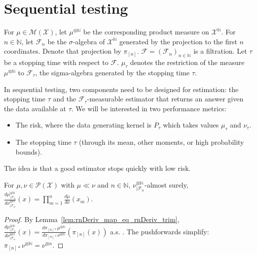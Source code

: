 \section{Sequential testing}

For $\mu \in \mathcal M(\mathcal X)$, let $\mu^{\otimes \mathbb{N}}$ be the corresponding product measure on $\mathcal X^{\mathbb{N}}$.
For $n \in \mathbb{N}$, let $\mathcal F_n$ be the $\sigma$-algebra of $\mathcal X^{\mathbb{N}}$ generated by the projection to the first $n$ coordinates. Denote that projection by $\pi_{[n]}$.
$\mathcal F = (\mathcal F_n)_{n \in \mathbb{N}}$ is a filtration.
Let $\tau$ be a stopping time with respect to $\mathcal F$. $\mu_\tau$ denotes the restriction of the measure $\mu^{\otimes \mathbb{N}}$ to $\mathcal F_\tau$, the sigma-algebra generated by the stopping time $\tau$.

In sequential testing, two components need to be designed for estimation: the stopping time $\tau$ and the $\mathcal F_\tau$-measurable estimator that returns an answer given the data available at $\tau$.
We will be interested in two performance metrics:
\begin{itemize}
  \item The risk, where the data generating kernel is $P_\tau$ which takes values $\mu_\tau$ and $\nu_\tau$.
  \item The stopping time $\tau$ (through its mean, other moments, or high probability bounds).
\end{itemize}
The idea is that a good estimator stops quickly with low risk.


\begin{lemma}
  \label{lem:llr_filtration_nat}
  For $\mu, \nu \in \mathcal P(\mathcal X)$ with $\mu \ll \nu$ and $n \in \mathbb{N}$, $\nu^{\otimes \mathbb{N}}_{| \mathcal F_n}$-almost surely,
  $\frac{d \mu^{\otimes \mathbb{N}}_{| \mathcal F_n}}{d \nu^{\otimes \mathbb{N}}_{| \mathcal F_n}}(x) = \prod_{m=1}^n \frac{d \mu}{d \nu}(x_m)$.
\end{lemma}

\begin{proof}%
{}
By Lemma~\ref{lem:rnDeriv_map_eq_rnDeriv_trim}, $\frac{d \mu^{\otimes \mathbb{N}}_{| \mathcal F_n}}{d \nu^{\otimes \mathbb{N}}_{| \mathcal F_n}}(x) = \frac{d \pi_{[n]*}\mu^{\otimes \mathbb{N}}}{d \pi_{[n]*}\nu^{\otimes \mathbb{N}}}(\pi_{[n]}(x))$ a.s. . The pushforwards simplify: $\pi_{[n]*}\nu^{\otimes \mathbb{N}} = \nu^{\otimes n}$.
\end{proof}


